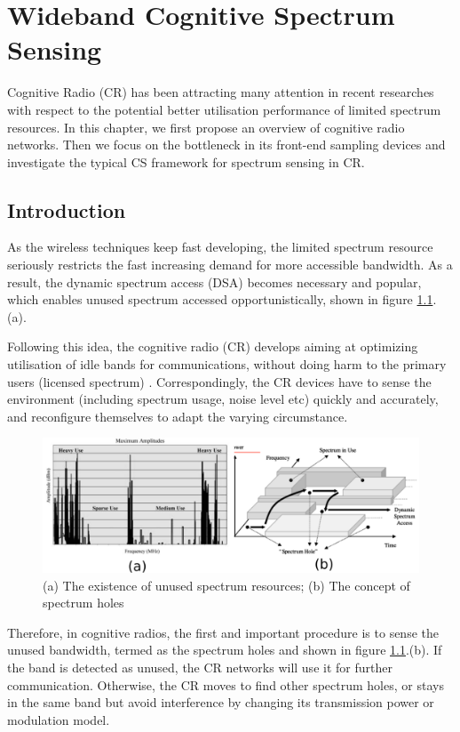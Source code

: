 \chapter{Wideband Cognitive Spectrum Sensing}\label{C:wideband_css}

Cognitive Radio (CR) has been attracting many attention in recent researches with respect to the potential better utilisation performance of limited spectrum resources. In this chapter, we first propose an overview of cognitive radio networks. Then we focus on the bottleneck in its front-end sampling devices and investigate the typical CS framework for spectrum sensing in CR. 

\section{Introduction}

As the wireless techniques keep fast developing, the limited spectrum resource seriously restricts the fast increasing demand for more accessible bandwidth. As a result, the dynamic spectrum access (DSA) becomes necessary and popular, which enables unused spectrum accessed opportunistically, shown in figure \ref{dsa-cr-intro}.(a). 

Following this idea, the cognitive radio (CR) develops aiming at optimizing utilisation of idle bands for communications, without doing harm to the primary users (licensed spectrum) \cite{akyildiz2006next}. Correspondingly, the CR devices have to sense the environment (including spectrum usage, noise level etc) quickly and accurately, and reconfigure themselves to adapt the varying circumstance.

\begin{figure}
\centering
\includegraphics[width=0.85\columnwidth]{figs/cr-intro.pdf}
\caption{(a) The existence of unused spectrum resources; (b) The concept of spectrum holes}
\label{dsa-cr-intro}
\end{figure}

Therefore, in cognitive radios, the first and important procedure is to sense the unused bandwidth, termed as the spectrum holes and shown in figure \ref{dsa-cr-intro}.(b). If the band is detected as unused, the CR networks will use it for further communication. Otherwise, the CR moves to find other spectrum holes, or stays in the same band but avoid interference by changing its transmission power or modulation model.

